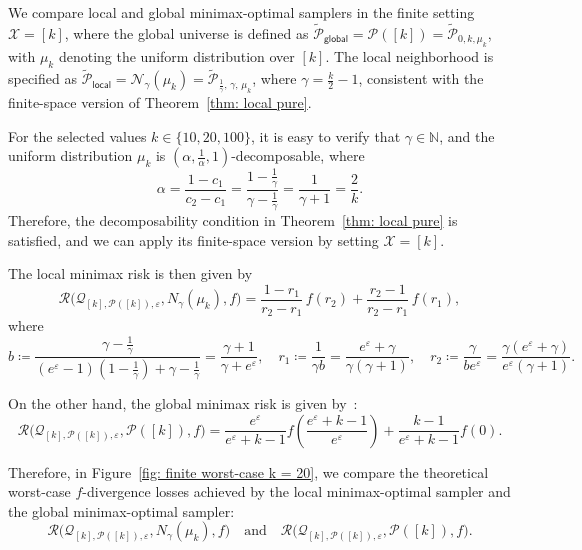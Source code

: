 \documentclass[accepted]{article}
\theoremstyle{plain} %
\theoremstyle{definition}
\theoremstyle{remark}
\begin{document}
We compare local and global minimax-optimal samplers in the finite setting \( \mathcal{X} = [k] \), where the global universe is defined as \( \tilde{\mathcal{P}}_{\textsf{global}} = \mathcal{P}([k]) = \tilde{\mathcal{P}}_{0, k, \mu_k} \), with \( \mu_k \) denoting the uniform distribution over \([k]\). The local neighborhood is specified as \( \tilde{\mathcal{P}}_{\textsf{local}} = \mathcal{N}_\gamma(\mu_k) = \tilde{\mathcal{P}}_{\frac{1}{\gamma},\, \gamma,\, \mu_k} \), where \( \gamma = \frac{k}{2} - 1 \), consistent with the finite-space version of Theorem~\ref{thm: local pure}.

For the selected values \( k \in \{10, 20, 100\} \), it is easy to verify that \( \gamma \in \mathbb{N} \), and the uniform distribution \( \mu_k \) is \( (\alpha, \frac{1}{\alpha}, 1) \)-decomposable, where
\[
\alpha = \frac{1 - c_1}{c_2 - c_1}
= \frac{1 - \frac{1}{\gamma}}{\gamma - \frac{1}{\gamma}}
= \frac{1}{\gamma + 1}
= \frac{2}{k}.
\]
Therefore, the decomposability condition in Theorem~\ref{thm: local pure} is satisfied, and we can apply its finite-space version by setting \( \mathcal{X} = [k] \).

The local minimax risk is then given by
\[
\mathcal{R}\big(\mathcal{Q}_{[k], \mathcal{P}([k]), \varepsilon}, N_\gamma(\mu_k), f\big) 
= \frac{1 - r_1}{r_2 - r_1} \, f(r_2) + \frac{r_2 - 1}{r_2 - r_1} \, f(r_1),
\]
where
\[
b \coloneqq \frac{\gamma - \tfrac{1}{\gamma}}{(e^\varepsilon - 1)(1 - \tfrac{1}{\gamma}) + \gamma - \tfrac{1}{\gamma}} 
= \frac{\gamma + 1}{\gamma + e^\varepsilon}, \quad
r_1 \coloneqq \frac{1}{\gamma b} = \frac{e^\varepsilon + \gamma}{\gamma(\gamma + 1)}, \quad
r_2 \coloneqq \frac{\gamma}{b e^\varepsilon} = \frac{\gamma(e^\varepsilon + \gamma)}{e^\varepsilon(\gamma + 1)}.
\]

On the other hand, the global minimax risk is given by~\citep[Theorem 3.1]{park2024exactly}:
\[
\mathcal{R}\big(\mathcal{Q}_{[k], \mathcal{P}([k]), \varepsilon}, \mathcal{P}([k]), f\big)
= \frac{e^{\varepsilon}}{e^{\varepsilon} + k - 1} 
  f\left( \frac{e^{\varepsilon} + k - 1}{e^{\varepsilon}} \right)
+ \frac{k - 1}{e^{\varepsilon} + k - 1} f(0).
\]

Therefore, in Figure~\ref{fig: finite worst-case k = 20}, we compare the theoretical worst-case \( f \)-divergence losses achieved by the local minimax-optimal sampler and the global minimax-optimal sampler:
\[
\mathcal{R}\big(\mathcal{Q}_{[k], \mathcal{P}([k]), \varepsilon}, N_\gamma(\mu_k), f\big)
\quad \text{and} \quad
\mathcal{R}\big(\mathcal{Q}_{[k], \mathcal{P}([k]), \varepsilon}, \mathcal{P}([k]), f\big).
\]
\end{document}
